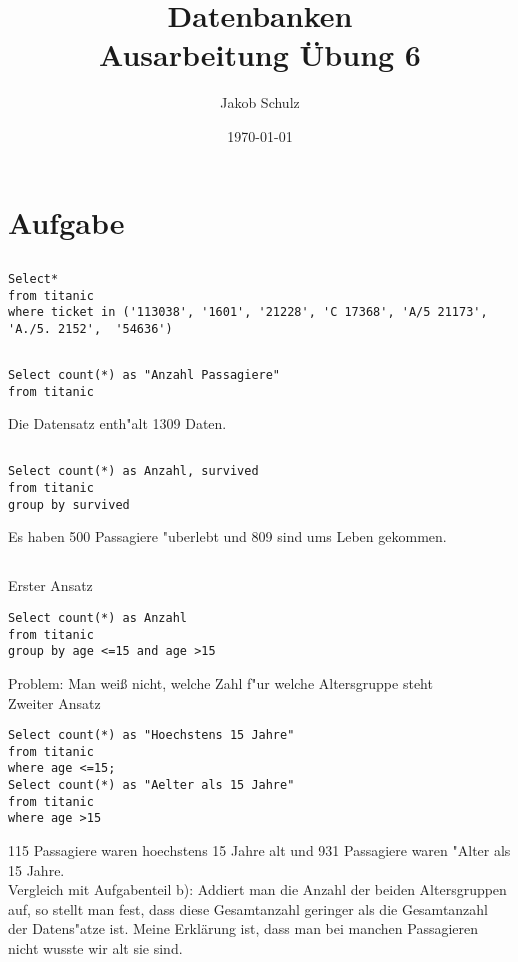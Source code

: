 \documentclass[a4paper, 11pt, titlepage]{article}
\begin{document}
\title{Datenbanken \\
Ausarbeitung \"Ubung 6}

\author{Jakob Schulz}

\date{\today}

\maketitle{\thispagestyle{plain}}

\section{Aufgabe}
\subsection{}
\begin{lstlisting}[style = sql]
Select*
from titanic
where ticket in ('113038', '1601', '21228', 'C 17368', 'A/5 21173', 'A./5. 2152',  '54636')
\end{lstlisting}
\subsection{}
\begin{lstlisting}[style = sql]
Select count(*) as "Anzahl Passagiere"
from titanic
\end{lstlisting}
Die Datensatz enth"alt 1309 Daten.
\subsection{}
\begin{lstlisting}[style = sql]
Select count(*) as Anzahl, survived
from titanic
group by survived
\end{lstlisting}
Es haben 500 Passagiere "uberlebt und 809 sind ums Leben gekommen.
\subsection{}
Erster Ansatz
\begin{lstlisting}[style = sql]
Select count(*) as Anzahl
from titanic
group by age <=15 and age >15
\end{lstlisting}
Problem: Man weiß nicht, welche Zahl f"ur welche Altersgruppe steht\\
Zweiter Ansatz
\begin{lstlisting}[style = sql]
Select count(*) as "Hoechstens 15 Jahre"
from titanic
where age <=15;
Select count(*) as "Aelter als 15 Jahre"
from titanic
where age >15
\end{lstlisting}
115 Passagiere waren hoechstens 15 Jahre alt und 931 Passagiere waren "Alter als 15 Jahre.\\
Vergleich mit Aufgabenteil b): Addiert man die Anzahl der beiden Altersgruppen auf, so stellt man fest, dass diese Gesamtanzahl geringer als die Gesamtanzahl der Datens"atze ist. Meine Erklärung ist, dass man bei manchen Passagieren nicht wusste wir alt sie sind. 
\end{document}
